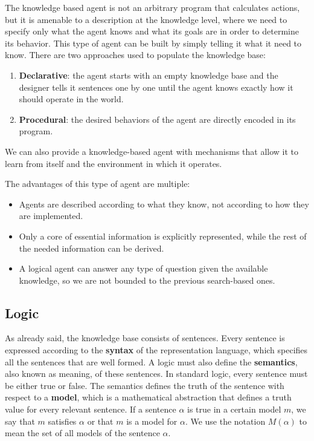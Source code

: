\documentclass{article}
\begin{document}
The knowledge based agent is not an arbitrary program that calculates actions, but it is amenable to a description at the knowledge level, where we need to specify only what the agent knows and what its goals are in order to determine its behavior. This type of agent can be built by simply telling it what it need to know. There are two approaches used to populate the knowledge base:
\begin{enumerate}
    \item \textbf{Declarative}: the agent starts with an empty knowledge base and the designer tells it sentences one by one until the agent knows exactly how it should operate in the world.
    \item \textbf{Procedural}: the desired behaviors of the agent are directly encoded in its program.
\end{enumerate}
We can also provide a knowledge-based agent with mechanisms that allow it to learn from itself and the environment in which it operates.

The advantages of this type of agent are multiple:
\begin{itemize}
    \item Agents are described according to what they know, not according to how they are implemented.
    \item Only a core of essential information is explicitly represented, while the rest of the needed information can be derived.
    \item A logical agent can answer any type of question given the available knowledge, so we are not bounded to the previous search-based ones.
\end{itemize}

\subsection{Logic}
As already said, the knowledge base consists of sentences. Every sentence is expressed according to the \textbf{syntax} of the representation language, which specifies all the sentences that are well formed. A logic must also define the \textbf{semantics}, also known as meaning, of these sentences. In standard logic, every sentence must be either true or false. The semantics defines the truth of the sentence with respect to a \textbf{model}, which is a mathematical abstraction that defines a truth value for every relevant sentence.  If a sentence $\alpha$ is true in a certain model $m$, we say that $m$ satisfies $\alpha$ or that $m$ is a model for $\alpha$. We use the notation $M(\alpha)$ to mean the set of all models of the sentence $\alpha$.
\end{document}
